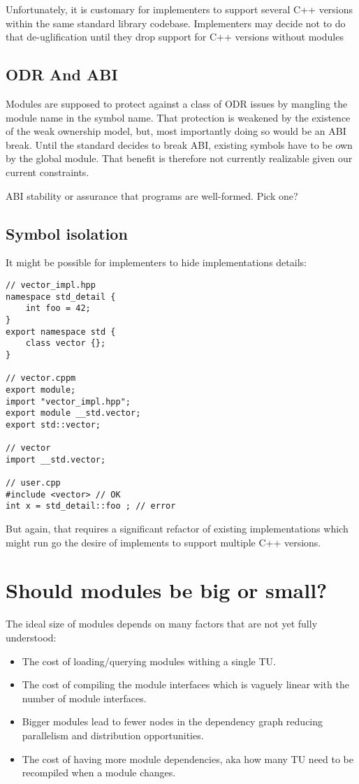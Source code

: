 \documentclass{wg21}
\begin{document}
Unfortunately, it is customary for implementers to support several C++ versions
within the same standard library codebase.
Implementers may decide not to do that de-uglification until they drop support for C++  versions without modules


\subsection{ODR And ABI}

Modules are supposed to protect against a class of ODR issues by mangling the module name in the symbol name.
That protection is weakened by the existence of the weak ownership model, but, most importantly doing so would be an ABI break.
Until the standard decides to break ABI, existing symbols have to be own by the global module.
That benefit is therefore not currently realizable given our current constraints.

ABI stability or assurance that programs are well-formed. Pick one? 


\subsection{Symbol isolation}

It might be possible for implementers to hide implementations details:

\begin{lstlisting}[style=color]
// vector_impl.hpp
namespace std_detail {
    int foo = 42;
}
export namespace std {
    class vector {};
}

// vector.cppm
export module;
import "vector_impl.hpp";
export module __std.vector;
export std::vector;

// vector
import __std.vector;

// user.cpp
#include <vector> // OK
int x = std_detail::foo ; // error
\end{lstlisting}

But again, that requires a significant refactor of existing implementations which might run go the desire of
implements to support multiple C++ versions.


\section{Should modules be big or small?}

The ideal size of modules depends on many factors that are not yet fully understood:

\begin{itemize}
\item The cost of loading/querying modules withing a single TU.
\item The cost of compiling the module interfaces which is vaguely linear with the number of module interfaces.
\item Bigger modules lead to fewer nodes in the dependency graph reducing parallelism and distribution opportunities.
\item The cost of having more module dependencies, aka how many TU need to be recompiled when a module changes.
\end{itemize}
\end{document}
